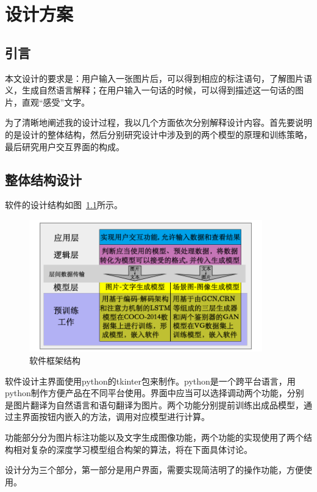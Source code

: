 
\chapter{设计方案}

\section{引言}
本文设计的要求是：用户输入一张图片后，可以得到相应的标注语句，了解图片语义，生成自然语言解释；在用户输入一句话的时候，可以得到描述这一句话的图片，直观“感受”文字。

为了清晰地阐述我的设计过程，我以几个方面依次分别解释设计内容。首先要说明的是设计的整体结构，然后分别研究设计中涉及到的两个模型的原理和训练策略，最后研究用户交互界面的构成。

\section{整体结构设计}
软件的设计结构如图~\ref{fig:struct}所示。

\begin{figure}[!htbp]
    \centering
    \includegraphics[width=0.9\textwidth]{figures/软件框架.png}
    \caption{软件框架结构}
    \label{fig:struct}
\end{figure}

软件设计主界面使用python的tkinter包来制作。python是一个跨平台语言，用python制作方便产品在不同平台使用。界面中应当可以选择调动两个功能，分别是图片翻译为自然语言和语句翻译为图片。两个功能分别提前训练出成品模型，通过主界面按钮内嵌入的方法，调用对应模型进行计算。

功能部分分为图片标注功能以及文字生成图像功能，两个功能的实现使用了两个结构相对复杂的深度学习模型组合构架的算法，将在下面具体讨论。

设计分为三个部分，第一部分是用户界面，需要实现简洁明了的操作功能，方便使用。

